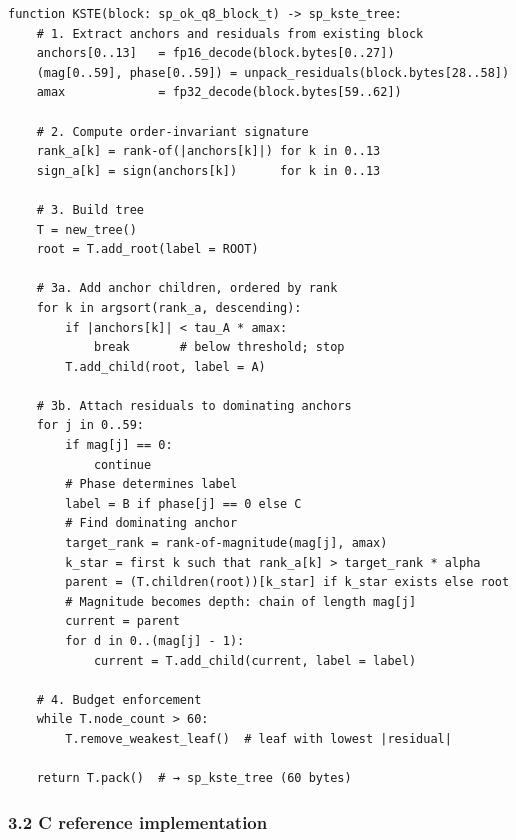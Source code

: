 \documentclass[
  11pt,
]{article}
\begin{document}
\begin{verbatim}
function KSTE(block: sp_ok_q8_block_t) -> sp_kste_tree:
    # 1. Extract anchors and residuals from existing block
    anchors[0..13]   = fp16_decode(block.bytes[0..27])
    (mag[0..59], phase[0..59]) = unpack_residuals(block.bytes[28..58])
    amax             = fp32_decode(block.bytes[59..62])

    # 2. Compute order-invariant signature
    rank_a[k] = rank-of(|anchors[k]|) for k in 0..13
    sign_a[k] = sign(anchors[k])      for k in 0..13

    # 3. Build tree
    T = new_tree()
    root = T.add_root(label = ROOT)

    # 3a. Add anchor children, ordered by rank
    for k in argsort(rank_a, descending):
        if |anchors[k]| < tau_A * amax:
            break       # below threshold; stop
        T.add_child(root, label = A)

    # 3b. Attach residuals to dominating anchors
    for j in 0..59:
        if mag[j] == 0:
            continue
        # Phase determines label
        label = B if phase[j] == 0 else C
        # Find dominating anchor
        target_rank = rank-of-magnitude(mag[j], amax)
        k_star = first k such that rank_a[k] > target_rank * alpha
        parent = (T.children(root))[k_star] if k_star exists else root
        # Magnitude becomes depth: chain of length mag[j]
        current = parent
        for d in 0..(mag[j] - 1):
            current = T.add_child(current, label = label)

    # 4. Budget enforcement
    while T.node_count > 60:
        T.remove_weakest_leaf()  # leaf with lowest |residual|

    return T.pack()  # → sp_kste_tree (60 bytes)
\end{verbatim}

\hypertarget{c-reference-implementation}{%
\subsubsection{3.2 C reference
implementation}\label{c-reference-implementation}}
\end{document}
